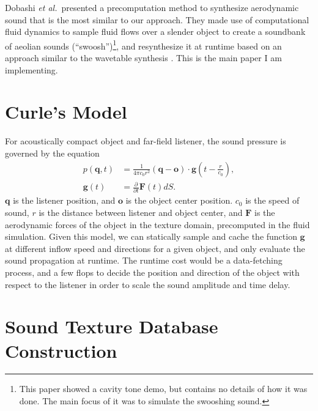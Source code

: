 \documentclass[tog]{acmsiggraph}
\def\p{\partial}
\def\f{\frac}
\def\mb{\mathbf}
\def\etal{\emph{et al.}}
\begin{document}
Dobashi \etal~presented a precomputation method to synthesize aerodynamic sound that is the most similar to our approach. They made use of computational fluid dynamics to sample fluid flows over a slender object to create a soundbank of aeolian sounds (``swoosh'')\footnote{This paper showed a cavity tone demo, but contains no details of how it was done. The main focus of it was to simulate the swooshing sound.}, and resynthesize it at runtime based on an approach similar to the wavetable synthesis \cite{vandenDoel2001}. This is the main paper I am implementing.


\section{Curle's Model}  \label{section:curle}

For acoustically compact object and far-field listener, the sound pressure is governed by the equation \cite{howe2002}
\begin{align}
    p(\mathbf{q}, t) &= \f{1}{4\pi c_0 r^2} (\mb{q} - \mb{o}) \cdot \mb{g}(t-\f{r}{c_0}), \\
    \mb{g}(t) &= \f{\p}{\p t}\mb{F}(t) dS.
\end{align}
$\mb{q}$ is the listener position, and $\mb{o}$ is the object center position. $c_0$ is the speed of sound, $r$ is the distance between listener and object center, and $\mb{F}$ is the aerodynamic forces of the object in the texture domain, precomputed in the fluid simulation. Given this model, we can statically sample and cache the function $\mb{g}$ at different inflow speed and directions for a given object, and only evaluate the sound propagation at runtime. The runtime cost would be a data-fetching process, and a few flops to decide the position and direction of the object with respect to the listener in order to scale the sound amplitude and time delay.


\section{Sound Texture Database Construction}  \label{section:sound_texture}
\end{document}
